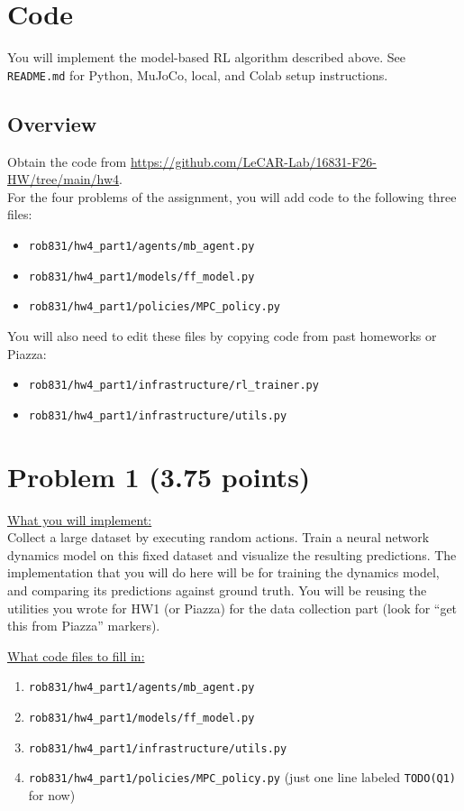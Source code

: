 \documentclass{article} %
\begin{document}
\section{Code}

You will implement the model-based RL algorithm described above. See \texttt{README.md} for Python, MuJoCo, local, and Colab setup instructions.

\subsection{Overview}

Obtain the code from
\url{https://github.com/LeCAR-Lab/16831-F26-HW/tree/main/hw4}. \\

For the four problems of the assignment, you will add code to the following three files:
\begin{itemize}
\item \verb+rob831/hw4_part1/agents/mb_agent.py+
\item \verb+rob831/hw4_part1/models/ff_model.py+
\item \verb+rob831/hw4_part1/policies/MPC_policy.py+
\end{itemize}
You will also need to edit these files by copying code from past homeworks or Piazza:
\begin{itemize}
\item \verb+rob831/hw4_part1/infrastructure/rl_trainer.py+
\item \verb+rob831/hw4_part1/infrastructure/utils.py+
\end{itemize}

\newpage
\section*{Problem 1 (3.75 points)}

\underline{What you will implement:}\\
Collect a large dataset by executing random actions. Train a neural network dynamics model on this fixed dataset and visualize the resulting predictions. The implementation that you will do here will be for training the dynamics model, and comparing its predictions against ground truth. You will be reusing the utilities you wrote for HW1 (or Piazza) for the data collection part (look for ``get this from Piazza'' markers).

\underline{What code files to fill in:}
\begin{enumerate}
    \item \verb+rob831/hw4_part1/agents/mb_agent.py+
    \item \verb+rob831/hw4_part1/models/ff_model.py+
    \item \verb+rob831/hw4_part1/infrastructure/utils.py+
    \item \verb+rob831/hw4_part1/policies/MPC_policy.py+ (just one line labeled \verb+TODO(Q1)+ for now)
\end{enumerate}
\end{document}
